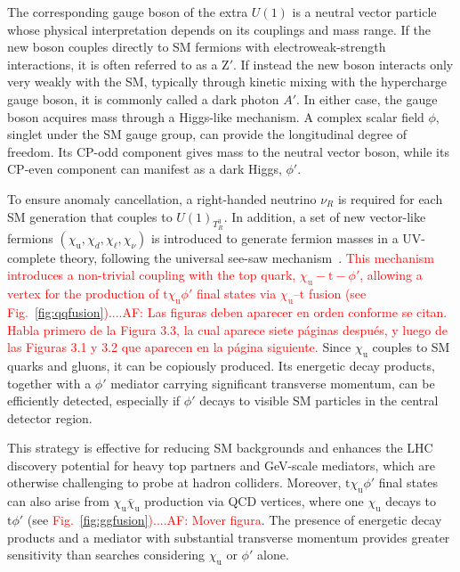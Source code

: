 The corresponding gauge boson of the extra $U(1)$ is a neutral vector particle whose physical interpretation depends on its couplings and mass range.  If the new boson couples directly to SM fermions with electroweak-strength interactions, it is often referred to as a $\textrm{Z}'$.  If instead the new boson interacts only very weakly with the SM, typically through kinetic mixing with the hypercharge gauge boson, it is commonly called a dark photon $A'$.  In either case, the gauge boson acquires mass through a Higgs-like mechanism. A complex scalar field $\phi$, singlet under the SM gauge group, can provide the longitudinal degree of freedom. Its CP-odd component gives mass to the neutral vector boson, while its CP-even component can manifest as a dark Higgs, $\phi'$.

To ensure anomaly cancellation, a right-handed neutrino $\nu_R$ is required for each SM generation that couples to $U(1)_{T^3_R}$. In addition, a set of new vector-like fermions $(\chi_\mathrm{u}, \chi_d, \chi_\ell, \chi_\nu)$ is introduced to generate fermion masses in a UV-complete theory, following the universal see-saw mechanism~\parencite{Berezhiani, Chang1987, Davidson1987, Rajpoot1987, Babu1989, Babu1990}. \textcolor{red}{This mechanism introduces a non-trivial coupling with the top quark, $\chi_\mathrm{u} - \mathrm{t} -\phi'$, allowing a vertex for the production of $\mathrm{t}\chi_\mathrm{u} \phi'$ final states via $\chi_\mathrm{u}$--$\mathrm{t}$ fusion (see Fig.~\ref{fig:qqfusion})....AF: Las figuras deben aparecer en orden conforme se citan. Habla primero de la Figura 3.3, la cual aparece siete páginas después, y luego de las Figuras 3.1 y 3.2 que aparecen en la página siguiente. } Since $\chi_\mathrm{u}$ couples to SM quarks and gluons, it can be copiously produced. Its energetic decay products, together with a $\phi'$ mediator carrying significant transverse momentum, can be efficiently detected, especially if $\phi'$ decays to visible SM particles in the central detector region.

This strategy is effective for reducing SM backgrounds and enhances the LHC discovery potential for heavy top partners and GeV-scale mediators, which are otherwise challenging to probe at hadron colliders. Moreover, $\mathrm{t}\chi_\mathrm{u} \phi'$ final states can also arise from $\chi_\mathrm{u}\bar\chi_\mathrm{u}$ production via QCD vertices, where one $\chi_\mathrm{u}$ decays to $\mathrm{t}\phi'$ (see \textcolor{red}{Fig.~\ref{fig:ggfusion})....AF: Mover figura}. The presence of energetic decay products and a mediator with substantial transverse momentum provides greater sensitivity than searches considering $\chi_\mathrm{u}$ or $\phi'$ alone.

